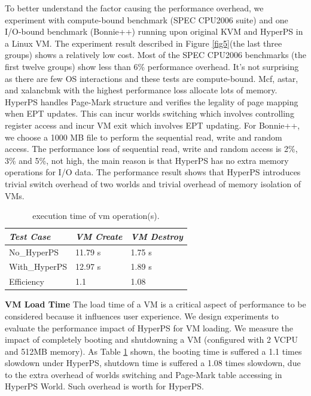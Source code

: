 \documentclass[conference]{IEEEtran}
\begin{document}
To better understand the factor causing the performance overhead, we experiment with compute-bound benchmark (SPEC CPU2006 suite) and one I/O-bound benchmark (Bonnie++) running upon original KVM and HyperPS in a Linux VM. The experiment result described in Figure \ref{fig5}(the last three groups) shows a relatively low cost. Most of the SPEC CPU2006 benchmarks (the first twelve groups) show less than 6\% performance overhead. It's not surprising as there are few OS interactions and these tests are compute-bound. Mcf, astar, and xalancbmk with the highest performance loss allocate lots of memory. HyperPS handles Page-Mark structure and verifies the legality of page mapping when EPT updates. This can incur worlds switching which involves controlling register access and incur VM exit which involves EPT updating.
 For Bonnie++, we choose a 1000 MB file to perform the sequential read, write and random access. The performance loss of sequential read, write and random access is 2\%, 3\% and 5\%, not high, the main reason is that HyperPS has no extra memory operations for I/O data. The performance result shows that HyperPS introduces trivial switch overhead of two worlds and trivial overhead of memory isolation of VMs.

\begin{table}
\centering
\caption{execution time of vm operation(s).}\label{tabvm}
\begin{tabular}{p{2cm}|p{1.4cm}|p{1.5cm}}
\hline
{\itshape\bfseries  Test Case} & {\itshape\bfseries VM Create} & {\itshape\bfseries VM Destroy} \\
\hline
No\_HyperPS & 11.79 s &  1.75 s\\
\hline
With\_HyperPS & 12.97 s & 1.89 s\\ 
\hline
Efficiency & 1.1 & 1.08 \\
\hline
\end{tabular}
\end{table}


\textbf {VM Load Time}
The load time of a VM is a critical aspect of performance to be considered because it influences user experience. We design experiments to evaluate the performance impact of HyperPS for VM loading.
 We measure the impact of completely booting and shutdowning a VM (configured with 2 VCPU and 512MB memory). As Table \ref{tabvm} shown, the booting time is suffered a 1.1 times slowdown under HyperPS, shutdown time is suffered a 1.08 times slowdown, due to the extra overhead of worlds switching and Page-Mark table accessing in HyperPS World. Such overhead is worth for HyperPS.
\end{document}
